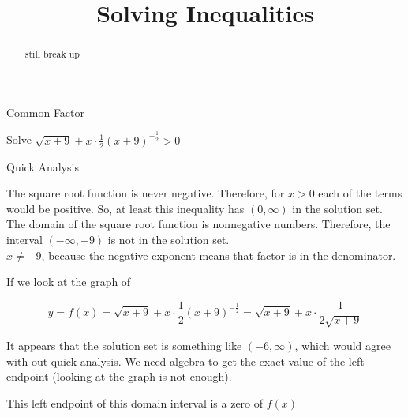 \documentclass{ximera}
\title{Solving Inequalities}
\begin{document}
\begin{abstract}
still break up
\end{abstract}
\maketitle









\begin{example}  Common Factor


Solve $\sqrt{x+9} + x \cdot \frac{1}{2} (x+9)^{-\tfrac{1}{2}} > 0$



\begin{explanation}




\begin{idea} Quick Analysis


The square root function is never negative.  Therefore, for $x > 0$ each of the terms would be positive.  So, at least this inequality has $(0, \infty)$ in the solution set.  \\


The domain of the square root function is nonnegative numbers.  Therefore, the interval $(-\infty, -9)$ is not in the solution set.   \\


$x \ne -9$, because the negative exponent means that factor is in the denominator.

\end{idea}



If we look at the graph of  

\[
y = f(x) = \sqrt{x+9} + x \cdot \frac{1}{2} (x+9)^{-\tfrac{1}{2}} = \sqrt{x+9} + x \cdot \frac{1}{2 \sqrt{x+9}} 
\]




\begin{center}
\end{center}




It appears that the solution set is something like  $(-6, \infty)$, which would agree with out quick analysis.  We need algebra to get the exact value of the left endpoint (looking at the graph is not enough).


This left endpoint of this domain interval is a zero of $f(x)$ \\ 







\end{explanation}
\end{example}
\end{document}
